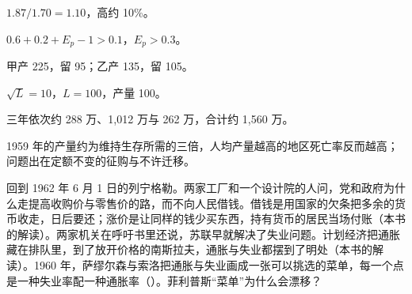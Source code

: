 \begin{answers}
\item $1.87/1.70=1.10$，高约 10\%。
\item $0.6+0.2+E_p-1>0.1$，$E_p>0.3$。
\item 甲产 225，留 95；乙产 135，留 105。
\item $\sqrt L=10$，$L=100$，产量 100。
\item 三年依次约 288 万、1,012 万与 262 万，合计约 1,560 万。
\item 1959 年的产量约为维持生存所需的三倍，人均产量越高的地区死亡率反而越高；问题出在定额不变的征购与不许迁移。
\end{answers}

回到 1962 年 6 月 1 日的列宁格勒。两家工厂和一个设计院的人问，党和政府为什么走提高收购价与零售价的路，而不向人民借钱\cite{lenkom1962}。借钱是用国家的欠条把多余的货币收走，日后要还；涨价是让同样的钱少买东西，持有货币的居民当场付账（本书的解读）。两家机关在呼吁书里还说，苏联早就解决了失业问题\cite{zv1962}。计划经济把通胀藏在排队里，到了放开价格的南斯拉夫，通胀与失业都摆到了明处（本书的解读）。1960 年，萨缪尔森与索洛把通胀与失业画成一张可以挑选的菜单，每一个点是一种失业率配一种通胀率（）。菲利普斯“菜单”为什么会漂移？
